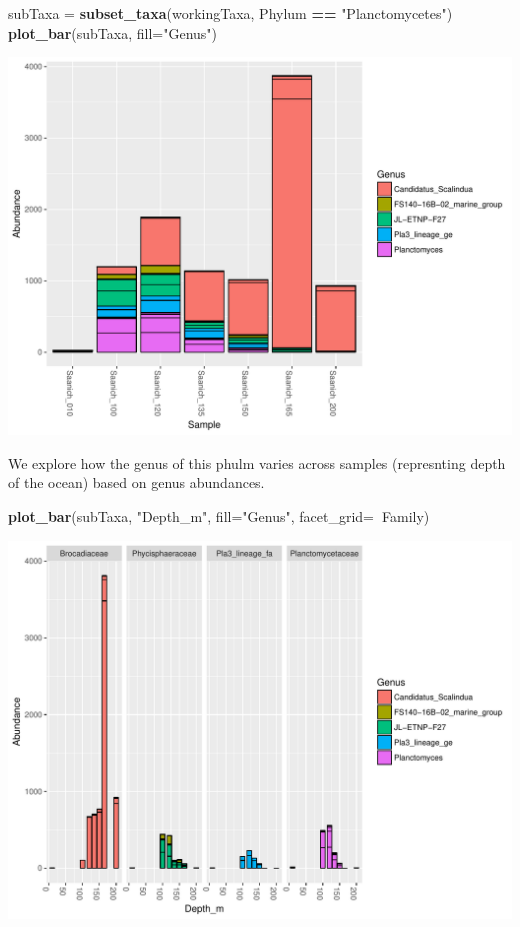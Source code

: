 \documentclass[11 pt,]{article}
\newenvironment{Shaded}{\begin{snugshade}}{\end{snugshade}}
\newcommand{\KeywordTok}[1]{\textcolor[rgb]{0.13,0.29,0.53}{\textbf{#1}}}
\newcommand{\DataTypeTok}[1]{\textcolor[rgb]{0.13,0.29,0.53}{#1}}
\newcommand{\StringTok}[1]{\textcolor[rgb]{0.31,0.60,0.02}{#1}}
\newcommand{\OperatorTok}[1]{\textcolor[rgb]{0.81,0.36,0.00}{\textbf{#1}}}
\newcommand{\NormalTok}[1]{#1}
\begin{document}
\begin{Shaded}
\begin{Highlighting}[]
\NormalTok{subTaxa =}\StringTok{ }\KeywordTok{subset_taxa}\NormalTok{(workingTaxa, Phylum }\OperatorTok{==}\StringTok{ "Planctomycetes"}\NormalTok{)}
\KeywordTok{plot_bar}\NormalTok{(subTaxa, }\DataTypeTok{fill=}\StringTok{"Genus"}\NormalTok{)}
\end{Highlighting}
\end{Shaded}

\includegraphics{Figs/unnamed-chunk-12-1.pdf}

We explore how the genus of this phulm varies across samples
(represnting depth of the ocean) based on genus abundances.

\begin{Shaded}
\begin{Highlighting}[]
\KeywordTok{plot_bar}\NormalTok{(subTaxa, }\StringTok{"Depth_m"}\NormalTok{, }\DataTypeTok{fill=}\StringTok{"Genus"}\NormalTok{, }\DataTypeTok{facet_grid=}\OperatorTok{~}\NormalTok{Family)}
\end{Highlighting}
\end{Shaded}

\includegraphics{Figs/unnamed-chunk-13-1.pdf}
\end{document}
